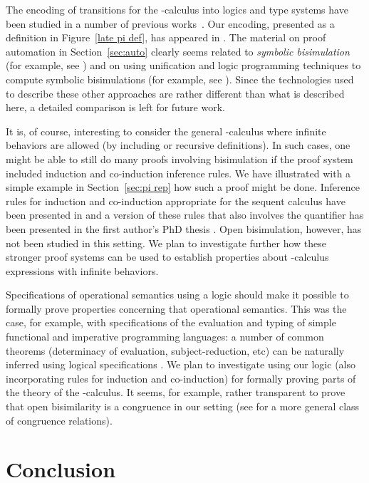 \documentclass{acmtrans2m}
\begin{document}
The encoding of transitions for the -calculus into logics and type
systems have been studied in a number of previous
works~\cite{honsell98,despeyroux00ifiptcs,honsell01tcs,roeckl01fossacs,bengtson07fossacs}.
Our encoding, presented as a definition in Figure~\ref{late pi def},
has appeared in \cite{miller99surveys,miller03lics}.  The material on
proof automation in Section~\ref{sec:auto} clearly seems related to
{\em symbolic bisimulation} (for example, see
\cite{hennessy95tcs,boreale96ic}) and on using unification and logic
programming techniques to compute symbolic bisimulations (for example,
see \cite{basu01iclp,boreale01icalp}).  Since the technologies used to
describe these other approaches are rather different than what is
described here, a detailed comparison is left for future work.

It is, of course, interesting to consider the general -calculus
where infinite behaviors are allowed (by including  or recursive
definitions).  In such cases, one might be able to still do many
proofs involving bisimulation if the proof system included induction
and co-induction inference rules. We have illustrated with a simple
example in Section~\ref{sec:pi rep} how such a proof might be done.
Inference rules for induction and co-induction appropriate for the 
sequent calculus have been presented 
in \cite{momigliano03types} and a version of these rules that also
involves the  quantifier has been presented in the first
author's PhD thesis \cite{tiu04phd}.  Open bisimulation, however, has not
been studied in this setting. We plan to investigate further how these
stronger proof systems can be used to establish properties about
-calculus expressions with infinite behaviors.

Specifications of operational semantics using a logic should make
it possible to formally prove properties concerning that operational
semantics.  This was the case, for example, with specifications of the
evaluation and typing of simple functional and imperative programming
languages: a number of common theorems (determinacy of evaluation,
subject-reduction, etc) can be naturally inferred using logical
specifications \cite{mcdowell02tocl}.  We plan to investigate using
our logic (also incorporating rules for induction and
co-induction) for formally proving parts of the theory of the
-calculus.  It seems, for example, rather transparent to prove
that open bisimilarity is a congruence in our setting (see
\cite{ziegler05sos} for a more general class of congruence relations).

\section{Conclusion}
\label{sec:conc}
\end{document}
